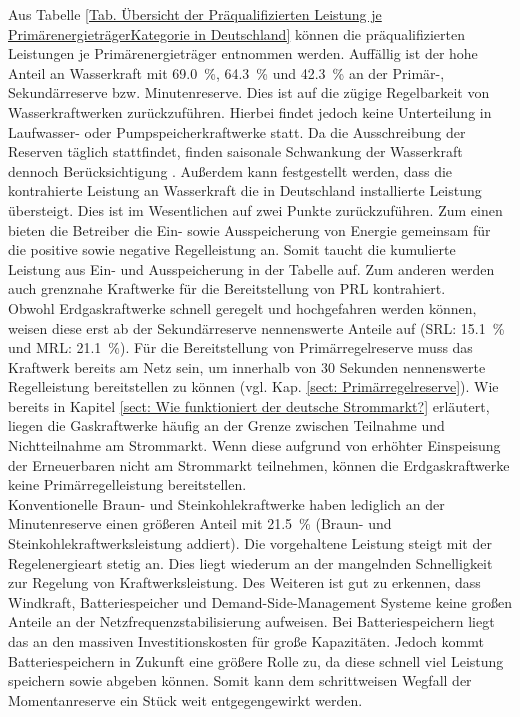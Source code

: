 			Aus Tabelle \ref{Tab. Übersicht der Präqualifizierten Leistung je PrimärenergieträgerKategorie in Deutschland} können die präqualifizierten Leistungen je Primärenergieträger entnommen werden.
			Auffällig ist der hohe Anteil an Wasserkraft mit \SI{69,0}{\percent}, \SI{64,3}{\percent} und \SI{42,3}{\percent} an der Primär-, Sekundärreserve bzw. Minutenreserve.
			Dies ist auf die zügige Regelbarkeit von Wasserkraftwerken zurückzuführen.
			Hierbei findet jedoch keine Unterteilung in Laufwasser- oder Pumpspeicherkraftwerke statt.
			Da die Ausschreibung der Reserven täglich stattfindet, finden saisonale Schwankung der Wasserkraft dennoch Berücksichtigung \cite{Doktorarbeit_Reitsam}. 
			Außerdem kann festgestellt werden, dass die kontrahierte Leistung an Wasserkraft die in Deutschland installierte Leistung übersteigt.
			Dies ist im Wesentlichen auf zwei Punkte zurückzuführen.
			Zum einen bieten die Betreiber die Ein- sowie Ausspeicherung von Energie gemeinsam für die positive sowie negative Regelleistung an.
			Somit taucht die kumulierte Leistung aus Ein- und Ausspeicherung in der Tabelle auf.
			Zum anderen werden auch grenznahe Kraftwerke für die Bereitstellung von PRL kontrahiert. \\
			
			Obwohl Erdgaskraftwerke schnell geregelt und hochgefahren werden können, weisen diese erst ab der Sekundärreserve nennenswerte Anteile auf (SRL: \SI{15,1}{\percent} und MRL: \SI{21,1}{\percent}).
			Für die Bereitstellung von Primärregelreserve muss das Kraftwerk bereits am Netz sein, um innerhalb von \num{30} Sekunden nennenswerte Regelleistung bereitstellen zu können (vgl. Kap. \ref{sect: Primärregelreserve}). 
			Wie bereits in Kapitel \ref{sect: Wie funktioniert der deutsche Strommarkt?} erläutert, liegen die Gaskraftwerke häufig an der Grenze zwischen Teilnahme und Nichtteilnahme am Strommarkt.  
			Wenn diese aufgrund von erhöhter Einspeisung der Erneuerbaren nicht am Strommarkt teilnehmen, können die Erdgaskraftwerke keine Primärregelleistung bereitstellen. \\
			
			Konventionelle Braun- und Steinkohlekraftwerke haben lediglich an der Minutenreserve einen größeren Anteil mit \SI{21,5}{\percent} (Braun- und Steinkohlekraftwerksleistung addiert).
			Die vorgehaltene Leistung steigt mit der Regelenergieart stetig an.
			Dies liegt wiederum an der mangelnden Schnelligkeit zur Regelung von Kraftwerksleistung. 
			Des Weiteren ist gut zu erkennen, dass Windkraft, Batteriespeicher und Demand-Side-Management Systeme keine großen Anteile an der Netzfrequenzstabilisierung aufweisen. 
			Bei Batteriespeichern liegt das an den massiven Investitionskosten für große Kapazitäten. 
			Jedoch kommt Batteriespeichern in Zukunft eine größere Rolle zu, da diese schnell viel Leistung speichern sowie abgeben können.
			Somit kann dem schrittweisen Wegfall der Momentanreserve ein Stück weit entgegengewirkt werden. 
			
